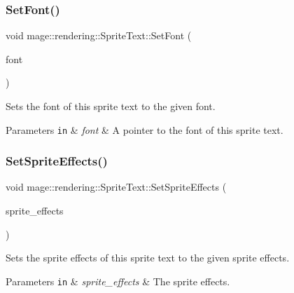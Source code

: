 \subsubsection{\texorpdfstring{Set\+Font()}{SetFont()}}
{\footnotesize\ttfamily void mage\+::rendering\+::\+Sprite\+Text\+::\+Set\+Font (\begin{DoxyParamCaption}\item[{\hyperlink{namespacemage_1_1rendering_ab2f34196c20422ca3692ad3f3bff3a5d}{Sprite\+Font\+Ptr}}]{font }\end{DoxyParamCaption})\hspace{0.3cm}{\ttfamily [noexcept]}}

Sets the font of this sprite text to the given font.


\begin{DoxyParams}[1]{Parameters}
\mbox{\tt in}  & {\em font} & A pointer to the font of this sprite text. \\
\hline
\end{DoxyParams}
\hypertarget{classmage_1_1rendering_1_1_sprite_text_a0d2f1e88db1e1fec1b7c6b2563ef7271}{}\label{classmage_1_1rendering_1_1_sprite_text_a0d2f1e88db1e1fec1b7c6b2563ef7271} 
\subsubsection{\texorpdfstring{Set\+Sprite\+Effects()}{SetSpriteEffects()}}
{\footnotesize\ttfamily void mage\+::rendering\+::\+Sprite\+Text\+::\+Set\+Sprite\+Effects (\begin{DoxyParamCaption}\item[{\hyperlink{namespacemage_1_1rendering_a4dbc3536c87b906f1d41d863ec458e78}{Sprite\+Effect}}]{sprite\+\_\+effects }\end{DoxyParamCaption})\hspace{0.3cm}{\ttfamily [noexcept]}}

Sets the sprite effects of this sprite text to the given sprite effects.


\begin{DoxyParams}[1]{Parameters}
\mbox{\tt in}  & {\em sprite\+\_\+effects} & The sprite effects. \\
\hline
\end{DoxyParams}
\hypertarget{classmage_1_1rendering_1_1_sprite_text_a3e7bc7515af8cb92351b0bef475e7dbe}{}\label{classmage_1_1rendering_1_1_sprite_text_a3e7bc7515af8cb92351b0bef475e7dbe} 
